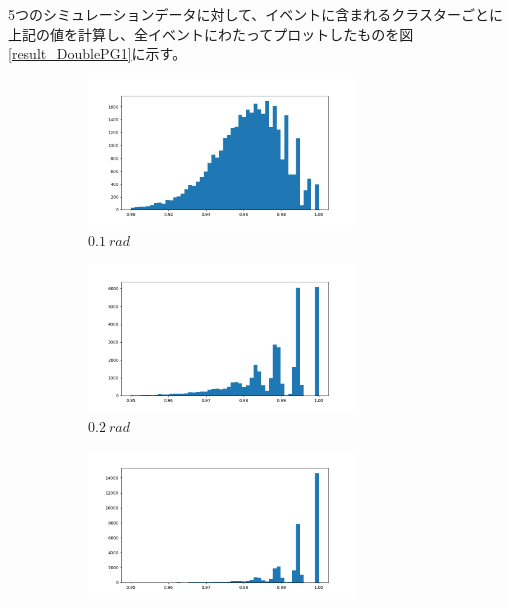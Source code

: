 5つのシミュレーションデータに対して、イベントに含まれるクラスターごとに上記の値を計算し、全イベントにわたってプロットしたものを図\ref{result_DoublePG1}に示す。


\begin{figure}[H]
	\begin{subfigure}{.5\textwidth}
		\begin{center}
 		 	\includegraphics[width=200pt]{./Figure/DLAnalysis/rate_pred_1.png}%
  			\caption{$\SI{0.1}{rad}$}
  			\label{fig:sfig1}
 		\end{center}
	\end{subfigure}
	\begin{subfigure}{.5\textwidth}
		\begin{center}
			\includegraphics[width=200pt]{./Figure/DLAnalysis/rate_pred_2.png}%
			\caption{$\SI{0.2}{rad}$}
			\label{fig:sfig2}
		\end{center}
	\end{subfigure}
		\begin{subfigure}{.5\textwidth}
		\begin{center}
			\includegraphics[width=200pt]{./Figure/DLAnalysis/rate_pred_3.png}%

\end{center}
\end{subfigure}
\end{figure}
